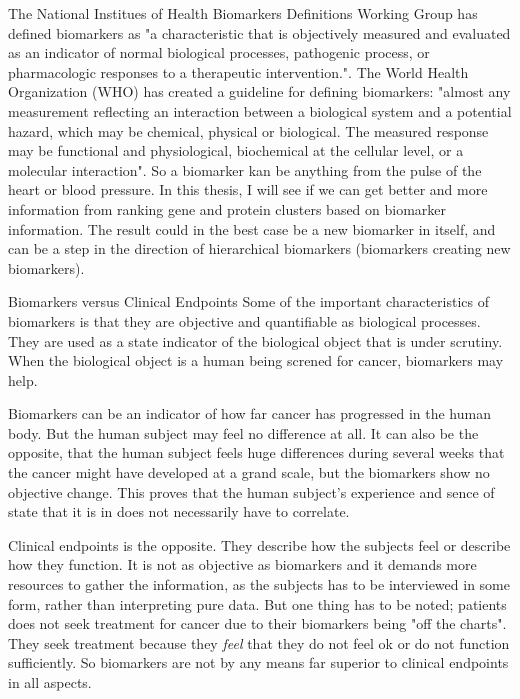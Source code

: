 \documentclass[UKenglish]{ifimaster}
\begin{document}
The National Institues of Health Biomarkers Definitions Working Group has defined biomarkers as "a characteristic that
is objectively measured and evaluated as an indicator of normal biological processes, pathogenic process, or
pharmacologic responses to a therapeutic intervention.". The World Health Organization (WHO) has created a guideline for
defining biomarkers: "almost any measurement reflecting an interaction between a biological system and a potential
hazard, which may be chemical, physical or biological. The measured response may be functional and physiological,
biochemical at the cellular level, or a molecular interaction". So a biomarker kan be anything from the pulse of the
heart or blood pressure. In this thesis, I will see if we can get better and more information from ranking gene and
protein clusters based on biomarker information. The result could in the best case be a new biomarker in itself, and can
be a step in the direction of hierarchical biomarkers (biomarkers creating new biomarkers).


Biomarkers versus Clinical Endpoints Some of the important characteristics of biomarkers is that they are objective and
quantifiable as biological processes. They are used as a state indicator of the biological object that is under
scrutiny. When the biological object is a human being screned for cancer, biomarkers may help.

Biomarkers can be an indicator of how far cancer has progressed in the human body. But the human subject may feel no
difference at all. It can also be the opposite, that the human subject feels huge differences during several weeks that
the cancer might have developed at a grand scale, but the biomarkers show no objective change. This proves that the
human subject's experience and sence of state that it is in does not necessarily have to correlate.

Clinical endpoints is the opposite. They describe how the subjects feel or describe how they function. It is not as
objective as biomarkers and it demands more resources to gather the information, as the subjects has to be interviewed
in some form, rather than interpreting pure data. But one thing has to be noted; patients does not seek treatment for
cancer due to their biomarkers being "off the charts". They seek treatment because they \textit{feel} that they do not
feel ok or do not function sufficiently. So biomarkers are not by any means far superior to clinical endpoints in all
aspects.
\end{document}
